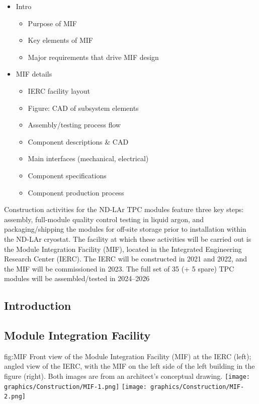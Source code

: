 \begin{itemize}
    \item Intro 
    \begin{itemize}
        \item Purpose of MIF
        \item Key elements of MIF
        \item Major requirements that drive MIF design
    \end{itemize}
    \item MIF details
    \begin{itemize}
        \item IERC facility layout
        \item Figure: CAD of subsystem elements       \item Assembly/testing process flow
        \item Component descriptions \& CAD
        \item Main interfaces (mechanical, electrical)
        \item Component specifications
        \item Component production process
    \end{itemize}
\end{itemize}

Construction activities for the ND-LAr TPC modules feature three key steps: assembly, full-module quality control testing in liquid argon, and packaging/shipping the modules for off-site storage prior to installation within the ND-LAr cryostat.  The facility at which these activities will be carried out is the Module Integration Facility (MIF), located in the Integrated Engineering Research Center (IERC).  The IERC will be constructed in 2021 and 2022, and the MIF will be commissioned in 2023.  The full set of 35 (+ 5 spare) TPC modules will be assembled/tested in 2024--2026

\subsection{Introduction}

\subsection{Module Integration Facility}

\begin{dunefigure}{fig:MIF}
{Front view of the Module Integration Facility (MIF) at the IERC (left); angled view of the IERC, with the MIF on the left side of the left building in the figure (right).  Both images are from an architect's conceptual drawing.}
\texttt{[image: graphics/Construction/MIF-1.png]}
\texttt{[image: graphics/Construction/MIF-2.png]}
\end{dunefigure}

